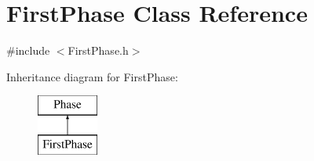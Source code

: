 \hypertarget{class_first_phase}{}\section{First\+Phase Class Reference}
\label{class_first_phase}


{\ttfamily \#include $<$First\+Phase.\+h$>$}

Inheritance diagram for First\+Phase\+:\begin{figure}[H]
\begin{center}
\leavevmode
\includegraphics[height=2.000000cm]{class_first_phase}
\end{center}
\end{figure}
